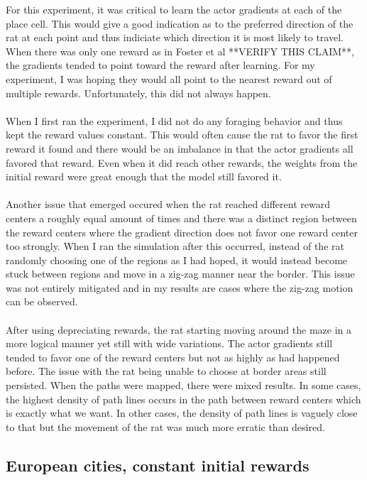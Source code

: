 \documentclass[conference]{IEEEtran}
\begin{document}
For this experiment, it was critical to learn the actor gradients at each of the place cell. This would give a good indication as to the preferred direction of the rat at each point and thus indiciate which direction it is most likely to travel. When there was only one reward as in Foster et al \cite{foster} **VERIFY THIS CLAIM**, the gradients tended to point toward the reward after learning. For my experiment, I was hoping they would all point to the nearest reward out of multiple rewards. Unfortunately, this did not always happen. \\
\\
When I first ran the experiment, I did not do any foraging behavior and thus kept the reward values constant. This would often cause the rat to favor the first reward it found and there would be an imbalance in that the actor gradients all favored that reward. Even when it did reach other rewards, the weights from the initial reward were great enough that the model still favored it. \\
\\
Another issue that emerged occured when the rat reached different reward centers a roughly equal amount of times and there was a distinct region between the reward centers where the gradient direction does not favor one reward center too strongly. When I ran the simulation after this occurred, instead of the rat randomly choosing one of the regions as I had hoped, it would instead become stuck between regions and move in a zig-zag manner near the border. This issue was not entirely mitigated and in my results are cases where the zig-zag motion can be observed.\\
\\
After using depreciating rewards, the rat starting moving around the maze in a more logical manner yet still with wide variations. The actor gradients still tended to favor one of the reward centers but not as highly as had happened before. The issue with the rat being unable to choose at border areas still persisted. When the paths were mapped, there were mixed results. In some cases, the highest density of path lines occurs in the path between reward centers which is exactly what we want. In other cases, the density of path lines is vaguely close to that but the movement of the rat was much more erratic than desired.

\subsection{European cities, constant initial rewards}
\end{document}
